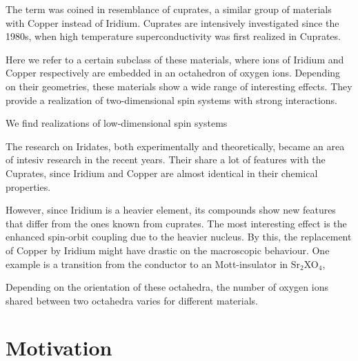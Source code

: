 \documentclass[a4paper,12pt]{report}
\begin{document}

The term was coined in resemblance of cuprates, a similar group of materials with Copper instead of Iridium.
Cuprates are intensively investigated since the 1980s, when high temperature superconductivity was first realized in Cuprates.


Here we refer to a certain subclass of these materials, where ions of Iridium and Copper respectively are embedded in an octahedron of oxygen ions.
Depending on their geometries, these materials show a wide range of interesting effects.
They provide a realization of two-dimensional spin systems with strong interactions. 




We find realizations of low-dimensional spin systems

The research on Iridates, both experimentally and theoretically, became an area of intesiv research in the recent years. 
Their share a lot of features with the Cuprates, since Iridium and Copper are almost identical in their chemical properties. 

However, since Iridium is a heavier element, its compounds show new features that differ from the ones known from cuprates.
The most interesting effect is the enhanced spin-orbit coupling due to the heavier nucleus.
By this, the replacement of Copper by Iridium might have drastic on the macroscopic behaviour. 
One example is a transition from the conductor to an Mott-insulator in Sr$_2$XO$_4$, 

Depending on the orientation of these octahedra, the number of oxygen ions shared between two octahedra varies for different materials. 





\section{Motivation}

\end{document}
